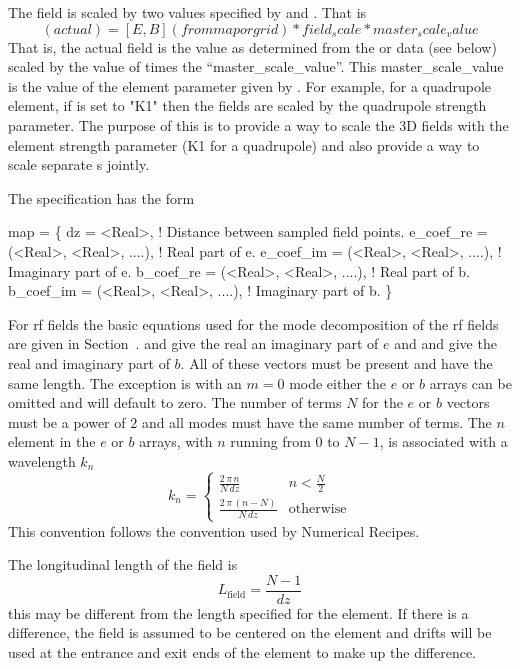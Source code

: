 The field is scaled by two values specified by  and
. That is
\begin{equation}
  [E, B] (actual) = [E, B] (from map or grid) * field_scale * master_scale_value
\end{equation}
That is, the actual field is the value as determined from the 
or  data (see below) scaled by the value of 
times the ``master_scale_value''. This master_scale_value is the value
of the element parameter given by . For example, for
a quadrupole element, if  is set to "K1" then the
fields are scaled by the quadrupole strength parameter. The purpose of
this  is to provide a way to scale the 3D fields with
the element strength parameter (K1 for a quadrupole) and also provide
a way to scale separate s jointly.

The  specification has the form
\begin{example}
  map = \{
    dz        = <Real>,    ! Distance between sampled field points.
    e_coef_re = (<Real>, <Real>, ....),  ! Real part of e.
    e_coef_im = (<Real>, <Real>, ....),  ! Imaginary part of e.
    b_coef_re = (<Real>, <Real>, ....),  ! Real part of b.
    b_coef_im = (<Real>, <Real>, ....),  ! Imaginary part of b.
  \}
\end{example}
For rf fields the basic equations used for the mode decomposition of
the rf fields are given in Section~. 
 and  give the real an imaginary part of $e$ and
 and  give the real and imaginary part of $b$. All
of these vectors must be present and have the same length. The
exception is with an $m = 0$ mode either the $e$ or $b$ arrays can be
omitted and will default to zero. The number of terms $N$ for the $e$
or $b$ vectors must be a power of $2$ and all modes must have the same
number of terms. The $n$\Th element in the $e$ or $b$ arrays, with $n$
running from 0 to $N-1$, is associated with a wavelength $k_n$
\begin{equation}
  k_n = \begin{cases}
    \frac{2 \, \pi \, n}{N \, dz} & n < \frac{N}{2} \\
    \frac{2 \, \pi \, (n-N)}{N \, dz} & \mbox{otherwise}
  \end{cases}
\end{equation}
This convention follows the convention used by Numerical
Recipes\cite{b:nr}.  

The longitudinal length
of the field is
\begin{equation}
  L_{\mbox{field}} = \frac{N - 1}{dz}
\end{equation}
this may be different from the length  specified for the
element. If there is a difference, the field is assumed to be centered
on the element and drifts will be used at the entrance and exit ends
of the element to make up the difference.

